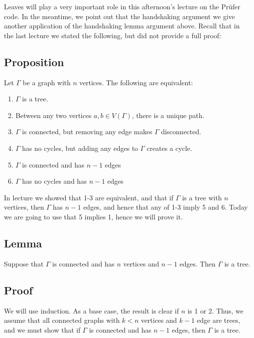 \documentclass[]{article}
\providecommand{\tightlist}{%
  \setlength{\itemsep}{0pt}\setlength{\parskip}{0pt}}
\begin{document}
Leaves will play a very important role in this afternoon's lecture on
the Prüfer code. In the meantime, we point out that the handshaking
argument we give another application of the handshaking lemma argument
above. Recall that in the last lecture we stated the following, but did
not provide a full proof:

\subsection{Proposition}\label{proposition-2}

Let \(\Gamma\) be a graph with \(n\) vertices. The following are
equivalent:

\begin{enumerate}
\def\labelenumi{\arabic{enumi}.}
\tightlist
\item
  \(\Gamma\) is a tree.
\item
  Between any two vertices \(a,b\in V(\Gamma)\), there is a unique path.
\item
  \(\Gamma\) is connected, but removing any edge makes \(\Gamma\)
  disconnected.
\item
  \(\Gamma\) has no cycles, but adding any edges to \(\Gamma\) creates a
  cycle.
\item
  \(\Gamma\) is connected and has \(n-1\) edges
\item
  \(\Gamma\) has no cycles and has \(n-1\) edges
\end{enumerate}

In lecture we showed that 1-3 are equivalent, and that if \(\Gamma\) is
a tree with \(n\) vertices, then \(\Gamma\) has \(n-1\) edges, and hence
that any of 1-3 imply 5 and 6. Today we are going to use that 5 implies
1, hence we will prove it.

\subsection{Lemma}\label{lemma-4}

Suppose that \(\Gamma\) is connected and has \(n\) vertices and \(n-1\)
edges. Then \(\Gamma\) is a tree.

\subsection{Proof}\label{proof-7}

We will use induction. As a base case, the result is clear if \(n\) is 1
or 2. Thus, we assume that all connected graphs with \(k<n\) vertices
and \(k-1\) edge are trees, and we must show that if \(\Gamma\) is
connected and has \(n-1\) edges, then \(\Gamma\) is a tree.
\end{document}
